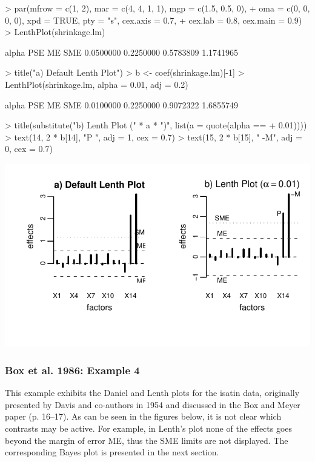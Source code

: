 \documentclass[letterpaper]{article}
\begin{document}
\begin{center}
\begin{Schunk}
\begin{Sinput}
> par(mfrow = c(1, 2), mar = c(4, 4, 1, 1), mgp = c(1.5, 0.5, 0), 
+     oma = c(0, 0, 0, 0), xpd = TRUE, pty = "s", cex.axis = 0.7, 
+     cex.lab = 0.8, cex.main = 0.9)
> LenthPlot(shrinkage.lm)
\end{Sinput}
\begin{Soutput}
    alpha       PSE        ME       SME 
0.0500000 0.2250000 0.5783809 1.1741965 
\end{Soutput}
\begin{Sinput}
> title("a) Default Lenth Plot")
> b <- coef(shrinkage.lm)[-1]
> LenthPlot(shrinkage.lm, alpha = 0.01, adj = 0.2)
\end{Sinput}
\begin{Soutput}
    alpha       PSE        ME       SME 
0.0100000 0.2250000 0.9072322 1.6855749 
\end{Soutput}
\begin{Sinput}
> title(substitute("b) Lenth Plot (" * a * ")", list(a = quote(alpha == 
+     0.01))))
> text(14, 2 * b[14], "P ", adj = 1, cex = 0.7)
> text(15, 2 * b[15], " -M", adj = 0, cex = 0.7)
\end{Sinput}
\end{Schunk}
\includegraphics{BsMD-005}
\end{center}

\subsubsection{Box et al. 1986: Example 4\label{sec:isatin}}
This example exhibits the Daniel and Lenth plots for the isatin data,
originally presented by Davis and co-authors in 1954 and discussed in the Box
and Meyer paper (p. 16--17). As can be seen in the figures below, it is not
clear which contrasts may be active. For example, in Lenth's plot none of the
effects goes beyond the margin of error ME, thus the SME limits are not
displayed. The corresponding Bayes plot is presented in the next section.
\end{document}
